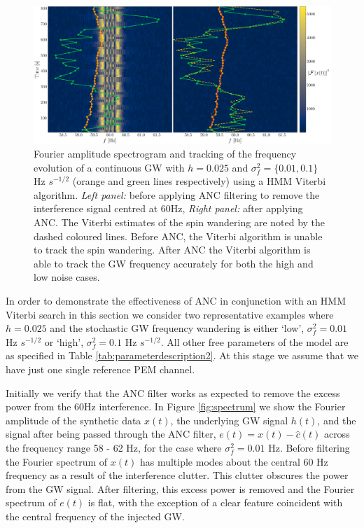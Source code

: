 \documentclass[pra,superscriptaddress,reprint,amsmath,amssymb,nofootinbib]{revtex4-2}
\begin{document}
\begin{figure}
	\begin{center}
			\includegraphics[width=\textwidth]{images/viterbi_tracking_canonical}
		\end{center}
	\caption{\label{frequency tracking before and after1}
			Fourier amplitude spectrogram and tracking of the frequency evolution of a continuous GW with $h = 0.025$ and $\sigma_f^2 = \{0.01, 0.1\}$ Hz $s^{-1/2}$ (orange and green lines respectively) using a HMM Viterbi algorithm. \textit{Left panel:}  before applying ANC filtering to remove the interference signal centred at 60Hz, \textit{Right panel:} after applying ANC. The Viterbi estimates of the spin wandering are noted by the dashed coloured lines. Before ANC, the Viterbi algorithm is unable to track the spin wandering. After ANC the Viterbi algorithm is able to track the GW frequency accurately for both the high and low noise cases.}
\end{figure}

In order to demonstrate the effectiveness of ANC in conjunction with an HMM Viterbi search in this section we consider two representative examples where $h = 0.025$ and the stochastic GW frequency wandering is either `low', $\sigma_f^2 = 0.01$ Hz  $s^{-1/2}$ or `high', $\sigma_f^2 = 0.1$ Hz  $s^{-1/2}$. All other free parameters of the model are as specified in Table \ref{tab:parameterdescription2}. At this stage we assume that we have just one single reference PEM channel. \newline 


Initially we verify that the ANC filter works as expected to remove the excess power from the 60Hz interference. In Figure \ref{fig:spectrum} we show the Fourier amplitude of the synthetic data $x(t)$, the underlying GW signal $h(t)$, and the signal after being passed through the ANC filter, $e(t) = x(t) - \hat{c}(t)$ across the frequency range 58 - 62 Hz, for the case where $\sigma_f^2 = 0.01$ Hz. Before filtering the Fourier spectrum of $x(t)$ has multiple modes about the central 60 Hz frequency as a result of the interference clutter. This clutter obscures the power from the GW signal. After filtering, this excess power is removed and the Fourier spectrum of $e(t)$ is flat, with the exception of a clear feature coincident with the central frequency of the injected GW.  \newline 
 
\end{document}

